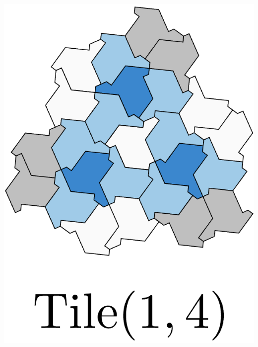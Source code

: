 \documentclass[class=beamer, crop=false]{standalone}
\begin{document}
\begin{minipage}{0.24\textwidth}
\begin{minipage}[t]{0.24\textwidth}
    \includegraphics[width=\linewidth]{images/polykite-family/tile(1,4).png}
  \end{minipage}\hfill
  \begin{minipage}[t]{0.24\textwidth}
    \centering

\end{minipage}
\end{minipage}
\end{document}

